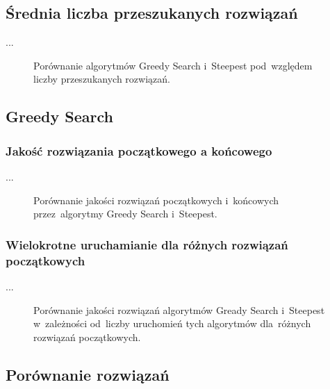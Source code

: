 \subsection{Średnia liczba przeszukanych rozwiązań}

...

\begin{figure}
\begin{center}
\end{center}
\caption{Porównanie algorytmów Greedy Search i~Steepest pod~względem liczby przeszukanych rozwiązań.}
\label{fig:nsol}
\end{figure}

\subsection{Greedy Search}

\subsubsection{Jakość rozwiązania początkowego a końcowego}

...

\begin{figure}
\begin{center}
\end{center}
\caption{Porównanie jakości rozwiązań początkowych i~końcowych przez~algorytmy Greedy Search i~Steepest.}
\label{fig:diff}
\end{figure}

\subsubsection{Wielokrotne uruchamianie dla różnych rozwiązań początkowych}

...

\begin{figure}
\begin{center}
\end{center}
\caption{Porównanie jakości rozwiązań algorytmów Gready Search i~Steepest w~zależności od~liczby uruchomień tych algorytmów dla~różnych rozwiązań początkowych.}
\label{fig:more}
\end{figure}

\subsection{Porównanie rozwiązań}

